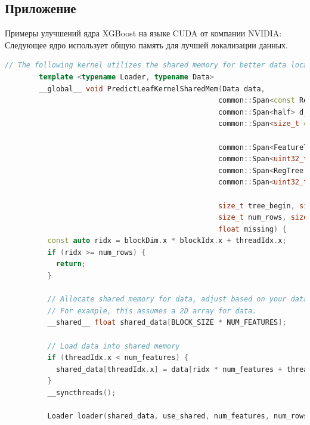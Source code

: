 \documentclass[14pt, a4paper]{extreport}
\begin{document}
    \subsection{Приложение } \label{subsec:xgboost_cuda_shared_memory_upgrade}
   Примеры улучшений ядра XGBoost на языке CUDA от компании NVIDIA: Следующее ядро использует общую память для лучшей локализации данных.

    \begin{lstlisting}[language=C++, label={lst:xgboost_shared_memory_calculation}]
        // The following kernel utilizes the shared memory for better data locality.
        template <typename Loader, typename Data>
        __global__ void PredictLeafKernelSharedMem(Data data,
                                                  common::Span<const RegTree::Node> d_nodes,
                                                  common::Span<half> d_out_predictions,
                                                  common::Span<size_t const> d_tree_segments,

                                                  common::Span<FeatureType const> d_tree_split_types,
                                                  common::Span<uint32_t const> d_cat_tree_segments,
                                                  common::Span<RegTree::CategoricalSplitMatrix::Segment const> d_cat_node_segments,
                                                  common::Span<uint32_t const> d_categories,

                                                  size_t tree_begin, size_t tree_end, size_t num_features,
                                                  size_t num_rows, size_t entry_start, bool use_shared,
                                                  float missing) {
          const auto ridx = blockDim.x * blockIdx.x + threadIdx.x;
          if (ridx >= num_rows) {
            return;
          }

          // Allocate shared memory for data, adjust based on your data structure.
          // For example, this assumes a 2D array for data.
          __shared__ float shared_data[BLOCK_SIZE * NUM_FEATURES];

          // Load data into shared memory
          if (threadIdx.x < num_features) {
            shared_data[threadIdx.x] = data[ridx * num_features + threadIdx.x];
          }
          __syncthreads();

          Loader loader(shared_data, use_shared, num_features, num_rows, entry_start, missing);


\end{lstlisting}
\end{document}

